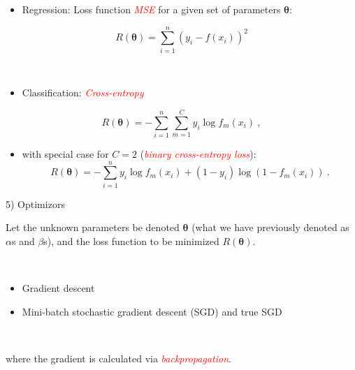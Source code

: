 \documentclass[
  10pt,
  ignorenonframetext,
  twocolumn]{beamer}
\providecommand{\tightlist}{%
  \setlength{\itemsep}{0pt}\setlength{\parskip}{0pt}}
\begin{document}
\begin{frame}
\begin{itemize}
\tightlist
\item
  Regression: Loss function \emph{\textcolor{red}{MSE}} for a given set
  of parameters \(\boldsymbol{\theta}\):
\end{itemize}

\[R({\boldsymbol \theta}) = \sum_{i=1}^n (y_i- f(x_i))^2\]

\(~\)

\begin{itemize}
\tightlist
\item
  Classification: \emph{\textcolor{red}{Cross-entropy}}
\end{itemize}

\[R({\boldsymbol \theta}) = -\sum_{i=1}^n \sum_{m=1}^C y_i \log f_m(x_i) \ ,\]

\begin{itemize}
\tightlist
\item
  with special case for \(C=2\)
  (\emph{\textcolor{red}{binary cross-entropy loss}}):
  \[R({\boldsymbol \theta}) = -\sum_{i=1}^n  y_i \log f_m(x_i) + (1-y_i) \log (1-f_m(x_i)) \ .\]
\end{itemize}
\end{frame}

\begin{frame}
\begin{block}{5) Optimizors}
\label{optimizors}
\(~\)

Let the unknown parameters be denoted \({\boldsymbol \theta}\) (what we
have previously denoted as \(\alpha\)s and \(\beta\)s), and the loss
function to be minimized \(R({\boldsymbol \theta})\).

\(~\)

\begin{itemize}
\item
  Gradient descent
\item
  Mini-batch stochastic gradient descent (SGD) and true SGD
\end{itemize}

\(~\)

where the gradient is calculated via
\emph{\textcolor{red}{backpropagation}}.
\end{block}
\end{frame}
\end{document}
